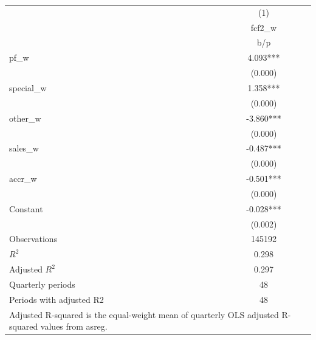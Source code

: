 {
\def\sym#1{\ifmmode^{#1}\else\(^{#1}\)\fi}
\begin{tabular}{l*{1}{c}}
\hline\hline
                    &\multicolumn{1}{c}{(1)}\\
                    &\multicolumn{1}{c}{fcf2\_w}\\
                    &         b/p   \\
\hline
pf\_w                &       4.093***\\
                    &     (0.000)   \\
special\_w           &       1.358***\\
                    &     (0.000)   \\
other\_w             &      -3.860***\\
                    &     (0.000)   \\
sales\_w             &      -0.487***\\
                    &     (0.000)   \\
accr\_w              &      -0.501***\\
                    &     (0.000)   \\
Constant            &      -0.028***\\
                    &     (0.002)   \\
\hline
Observations        &      145192   \\
\(R^{2}\)           &       0.298   \\
Adjusted \(R^{2}\)  &       0.297   \\
Quarterly periods   &          48   \\
Periods with adjusted R2&          48   \\
\hline\hline
\multicolumn{2}{l}{\footnotesize Adjusted R-squared is the equal-weight mean of quarterly OLS adjusted R-squared values from asreg.}\\
\end{tabular}
}
